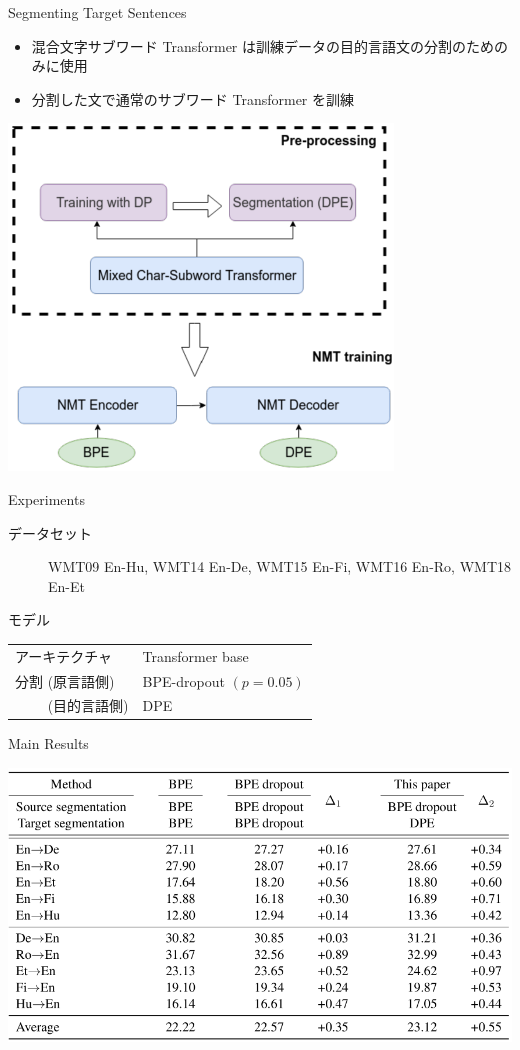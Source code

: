 \documentclass[unicode, 12pt, aspectratio=43]{beamer}
\begin{document}
\begin{frame}[label={sec:org3c115c0}]{Segmenting Target Sentences}
\begin{itemize}
\item 混合文字サブワード Transformer は訓練データの目的言語文の分割のためのみに使用
\item 分割した文で通常のサブワード Transformer を訓練
\end{itemize}
\begin{center}
\includegraphics[width=0.5\linewidth]{./figure/Figure3.pdf}
\end{center}
\end{frame}

\begin{frame}[label={sec:org02e4ae6}]{Experiments}
\begin{description}
\item[{データセット}] WMT09 En-Hu, WMT14 En-De, WMT15 En-Fi, WMT16 En-Ro, WMT18 En-Et
\item[{モデル}] 
\end{description}
\begin{center}
\begin{tabular}{ll}
\toprule
アーキテクチャ & Transformer base\\
分割 (原言語側) & BPE-dropout \((p=0.05)\)\\
　　 (目的言語側) & DPE\\
\bottomrule
\end{tabular}
\end{center}
\end{frame}

\begin{frame}[label={sec:org48400e6}]{Main Results}
\begin{center}
\includegraphics[width=\linewidth]{./figure/Table2.pdf}
\end{center}
\end{frame}
\end{document}
